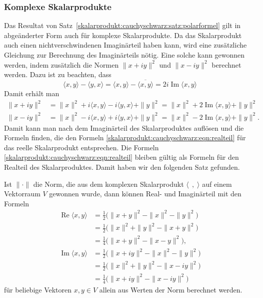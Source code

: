 \subsubsection{Komplexe Skalarprodukte}
Das Resultat von Satz~\ref{skalarprodukt:cauchyschwarz:satz:polarformel}
gilt in abgeänderter Form auch für komplexe Skalarprodukte.
Da das Skalarprodukt auch einen nichtverschwindenen Imaginärteil haben
kann, wird eine zusätzliche Gleichung zur Berechnung des Imaginärteils
nötig.
Eine solche kann gewonnen werden, indem zusätzlich die Normen
$\|x+iy\|^2$ und $\|x-iy\|^2$ berechnet werden.
Dazu ist zu beachten, dass
\[
\langle x,y\rangle
-
\langle y,x\rangle
=
\langle x,y\rangle
-
\overline{
\langle x,y\rangle
}
=
2i\operatorname{Im}\langle x,y\rangle
\]
Damit erhält man
\begin{align*}
\|x+iy\|^2 &= \|x\|^2 + i\langle x,y\rangle - i\langle y,x\rangle + \|y\|^2 
           = \|x\|^2 + 2\operatorname{Im}\langle x,y\rangle + \|y\|^2 \\
\|x-iy\|^2 &= \|x\|^2 - i\langle x,y\rangle + i\langle y,x\rangle + \|y\|^2 
           = \|x\|^2 - 2\operatorname{Im}\langle x,y\rangle + \|y\|^2.
\end{align*}
Damit kann man nach dem Imaginärteil des Skalarproduktes auflösen und
die Formeln
finden, die den Formeln
\eqref{skalarprodukt:cauchyschwarz:eqn:realteil}
für das reelle Skalarprodukt entsprechen.
Die Formeln
\eqref{skalarprodukt:cauchyschwarz:eqn:realteil}
bleiben gültig als Formeln für den Realteil des Skalarproduktes.
Damit haben wir den folgenden Satz gefunden.

\begin{satz}
Ist $\|\cdot\|$ die Norm, die aus dem komplexen Skalarprodukt
$\langle\;\,,\;\rangle$ auf einem Vektorraum $V$ gewonnen wurde,
dann können Real- und Imaginärteil mit den Formeln
\begin{align*}
\operatorname{Re}\langle x,y\rangle
&=
{\textstyle\frac12}\bigl(
\|x+y\|^2 - \|x\|^2 -\|y\|^2
\bigr)
\\
&=
{\textstyle\frac12}\bigl(
\|x\|^2 +\|y\|^2 - \|x+y\|^2
\bigr)
\\
&=
{\textstyle\frac14}\bigl(
\|x+y\|^2 - \|x-y\|^2
\bigr),
\\
\operatorname{Im}\langle x,y\rangle
&=
{\textstyle\frac12}\bigl(
\|x+iy\|^2-\|x\|^2-\|y\|^2
\bigr)
\\
&=
{\textstyle\frac12}\bigl(
\|x\|^2+\|y\|^2-\|x-iy\|^2
\bigr)
\\
&=
{\textstyle\frac14}\bigl(
\|x+iy\|^2
-
\|x-iy\|^2
\bigr)
\end{align*}
für beliebige Vektoren $x,y\in V$
allein aus Werten der Norm berechnet werden.
\end{satz}

